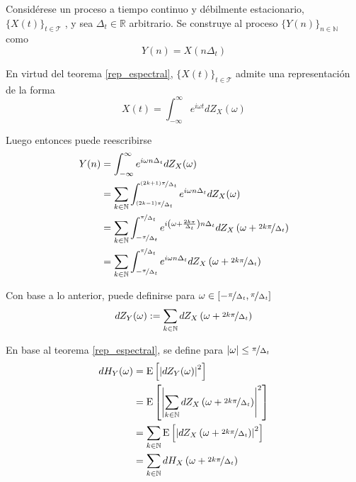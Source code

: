 \documentclass[12pt,letterpaper]{book}
\newcommand{\R}{\mathbb{R}}
\newcommand{\N}{\mathbb{N}}
\newcommand{\intR}{\int_{-\infty}^{\infty}}
\newcommand{\E}[1]{\mathrm{E}\left[ #1 \right]}
\newcommand{\abso}[1]{\left| #1 \right|}
\newcommand{\xt}{$\{X(t)\}_{t\in \mathcal{T}}$ }
\begin{document}
Considérese un proceso a tiempo continuo y débilmente estacionario, \xt, y sea $\Delta_t \in \R$ arbitrario.
%
Se construye al proceso $\{Y(n)\}_{n\in \mathbb{N}}$ como
\begin{equation}
Y(n) = X(n \Delta_t)
\end{equation}

En virtud del teorema \ref{rep_espectral}, \xt admite una representación de la forma
\begin{equation}
X(t) = \intR e^{i \omega t }  dZ_X(\omega)
\end{equation}

Luego entonces puede reescribirse
\begin{align}
Y(n) &= \intR e^{i \omega n \Delta_t} dZ_X(\omega) \nonumber \\
&= \sum_{k \in \N} \int_{\nicefrac{(2k-1)\pi}{\Delta_t}}^{\nicefrac{(2k+1)\pi}{\Delta_t}}
e^{i \omega n \Delta_t} dZ_X(\omega) \nonumber \\
&= \sum_{k \in \N} \int_{-\nicefrac{\pi}{\Delta_t}}^{\nicefrac{\pi}{\Delta_t}}
e^{i \left( \omega + \frac{2 k \pi}{\Delta_t} \right) n \Delta_t}
dZ_X\left( \omega + \nicefrac{2 k \pi}{\Delta_t}\right) \nonumber \\
&= \sum_{k \in \N} \int_{-\nicefrac{\pi}{\Delta_t}}^{\nicefrac{\pi}{\Delta_t}}
e^{i \omega n \Delta_t}
dZ_X\left( \omega + \nicefrac{2 k \pi}{\Delta_t}\right)
\end{align}

Con base a lo anterior, puede definirse para 
$\omega \in \left[ -\nicefrac{\pi}{\Delta_t} , \nicefrac{\pi}{\Delta_t} \right]$
\begin{equation}
dZ_Y(\omega) := \sum_{k \in \N} dZ_X\left( \omega + \nicefrac{2 k \pi}{\Delta_t}\right)
\end{equation}

En base al teorema \ref{rep_espectral}, se define para 
$\abso{\omega} \leq \nicefrac{\pi}{\Delta_t}$
\begin{align}
dH_Y(\omega) &= \E{\abso{dZ_Y(\omega)}^{2}} \nonumber \\
&= \E{\abso{\sum_{k \in \N} dZ_X\left( \omega + \nicefrac{2 k \pi}{\Delta_t}\right)}^{2}}
\nonumber \\
&= \sum_{k \in \N} \E{\abso{dZ_X\left( \omega + \nicefrac{2 k \pi}{\Delta_t}\right)}^{2}}
\nonumber \\
&= \sum_{k \in \N} dH_X\left( \omega + \nicefrac{2 k \pi}{\Delta_t}\right)
\end{align}
\end{document}
